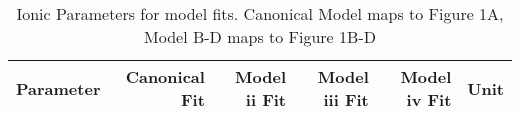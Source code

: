 \documentclass{article}
\begin{document}
	\begin{table}[]
   		\begin{tabular}{l|r|r|r|r|l}
			Parameter & \textbf{Canonical Fit} & Model ii Fit & Model iii Fit & Model iv Fit & Unit \\
			\hline
			
		\end{tabular}
		\caption{Ionic Parameters for model fits. Canonical Model maps to Figure 1A, Model B-D maps to Figure 1B-D}
	\end{table}
\end{document}
